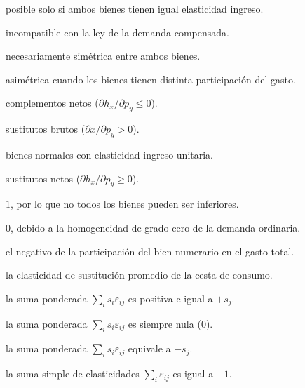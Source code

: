 \begin{opts}
    \item posible solo si ambos bienes tienen igual elasticidad ingreso.
    \item incompatible con la ley de la demanda compensada.
    \item necesariamente simétrica entre ambos bienes.
    \item asimétrica cuando los bienes tienen distinta participación del gasto.
\end{opts}

\begin{opts}
    \item complementos netos ($\partial h_x / \partial p_y \le 0$).
    \item sustitutos brutos ($\partial x / \partial p_y > 0$).
    \item bienes normales con elasticidad ingreso unitaria.
    \item sustitutos netos ($\partial h_x / \partial p_y \ge 0$).
\end{opts}

\begin{opts}
    \item $1$, por lo que no todos los bienes pueden ser inferiores.
    \item $0$, debido a la homogeneidad de grado cero de la demanda ordinaria.
    \item el negativo de la participación del bien numerario en el gasto total.
    \item la elasticidad de sustitución promedio de la cesta de consumo.
\end{opts}

\begin{opts}
    \item la suma ponderada $\sum_i s_i \varepsilon_{ij}$ es positiva e igual a $+s_j$.
    \item la suma ponderada $\sum_i s_i \varepsilon_{ij}$ es siempre nula ($0$).
    \item la suma ponderada $\sum_i s_i \varepsilon_{ij}$ equivale a $-s_j$.
    \item la suma simple de elasticidades $\sum_i \varepsilon_{ij}$ es igual a $-1$.
\end{opts}

